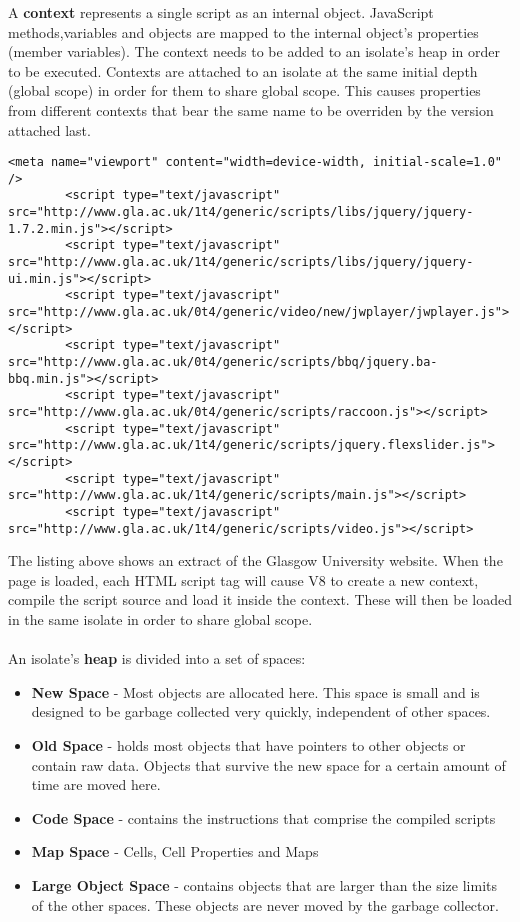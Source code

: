 \documentclass{l4proj}
\begin{document}
\newpage
A \textbf{context} represents a single script as an internal object. JavaScript methods,variables and objects are mapped to the internal object's properties (member variables). The context needs to be added to an isolate's heap in order to be executed. Contexts are attached to an isolate at the same initial depth (global scope) in order for them to share global scope. This causes properties from different contexts that bear the same name to be overriden by the version attached last. 
\begin{lstlisting}[style=htmlcssjs]
 <meta name="viewport" content="width=device-width, initial-scale=1.0" />
        <script type="text/javascript" src="http://www.gla.ac.uk/1t4/generic/scripts/libs/jquery/jquery-1.7.2.min.js"></script>
        <script type="text/javascript" src="http://www.gla.ac.uk/1t4/generic/scripts/libs/jquery/jquery-ui.min.js"></script>
        <script type="text/javascript" src="http://www.gla.ac.uk/0t4/generic/video/new/jwplayer/jwplayer.js"></script>
        <script type="text/javascript" src="http://www.gla.ac.uk/0t4/generic/scripts/bbq/jquery.ba-bbq.min.js"></script>
        <script type="text/javascript" src="http://www.gla.ac.uk/0t4/generic/scripts/raccoon.js"></script>
        <script type="text/javascript" src="http://www.gla.ac.uk/1t4/generic/scripts/jquery.flexslider.js"></script>
        <script type="text/javascript" src="http://www.gla.ac.uk/1t4/generic/scripts/main.js"></script>
        <script type="text/javascript" src="http://www.gla.ac.uk/1t4/generic/scripts/video.js"></script>
\end{lstlisting}
The listing above shows an extract of the Glasgow University website. When the page is loaded, each HTML script tag will cause V8 to create a new context, compile the script source and load it inside the context. These will then be loaded in the same isolate in order to share global scope.
\\\\
An isolate's \textbf{heap} is divided into a set of spaces:
\begin{itemize}
\item \textbf{New Space} - Most objects are allocated here. This space is small and is designed to be garbage collected very quickly, independent of other spaces. 
\item \textbf{Old Space} - holds most objects that have pointers to other objects or contain raw data. Objects that survive the new space for a certain amount of time are moved here.  
\item \textbf{Code Space} - contains the instructions that comprise the compiled scripts
\item \textbf{Map Space} - Cells, Cell Properties and Maps
\item \textbf{Large Object Space} - contains objects that are larger than the size limits of the other spaces. These objects are never moved by the garbage collector.
\end{itemize}
\end{document}
